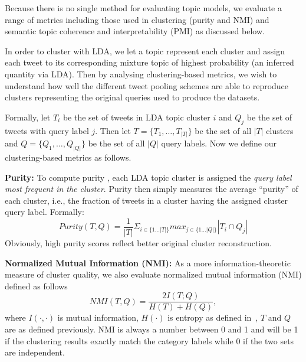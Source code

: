 \documentclass{sig-alternate}
\begin{document}
Because there is no single method for evaluating topic models, we
evaluate a range of metrics including those used in clustering (purity
and NMI) and semantic topic coherence and interpretability (PMI)
as discussed below.

In order to cluster with LDA, we let a topic represent each cluster
and assign each tweet to its corresponding mixture topic of highest
probability (an inferred quantity via LDA).  Then by analysing
clustering-based metrics, we wish to understand how well the different
tweet pooling schemes are able to reproduce clusters representing the
original queries used to produce the datasets.  

Formally, let $T_{i}$ be the set of tweets in LDA topic cluster $i$ and
$Q_{j}$ be the set of tweets with query label $j$.  Then let $T = \lbrace
T_{1}, \ldots , T_{|T|} \rbrace$ be the set of all $|T|$ clusters and $Q =
\lbrace Q_{1}, \ldots , Q_{|Q|} \rbrace$ be the set of all $|Q|$
query labels.  Now we define our clustering-based metrics as follows.

\vspace{1mm} \noindent \textbf{Purity:} To compute purity \cite{MRS08}, each LDA
topic cluster is assigned the \emph{query label most frequent in the
cluster}.  Purity then simply measures the average ``purity'' of each
cluster, i.e., the fraction of tweets in a cluster having the assigned
cluster query label.  Formally:
\[
 \mathit{Purity}(T,Q) = \frac{1}{|T|} \Sigma_{i \in \{ 1\ldots|T|\} } max_{j \in \{1\ldots|Q| \} } |T_{i} \cap Q_{j}|
\]
Obviously, high purity scores reflect better original cluster
reconstruction.

\vspace{1mm} \noindent \textbf{Normalized Mutual Information (NMI):} As a more
information-theoretic measure of cluster quality, we also evaluate
normalized mutual information (NMI) defined as follows
\[
\mathit{NMI}(T,Q) = \frac{2 I(T;Q)}{H(T) + H(Q)}, 
\]
where $I(\cdot,\cdot)$ is mutual information, $H(\cdot)$ is entropy
as defined in~\cite{MRS08}, $T$ and $Q$ are as defined previously.
NMI is always a number between 0 and 1 and will be 1 if the clustering
results exactly match the category labels while 0 if the two sets are
independent.
\end{document}
